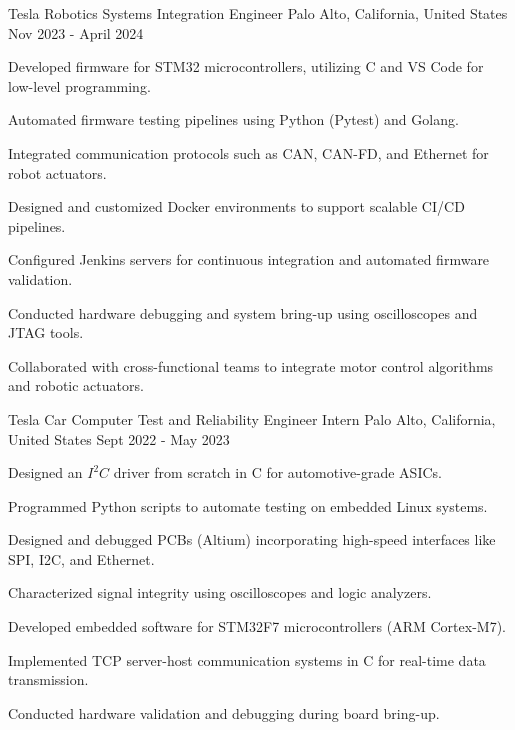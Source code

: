 \begin{cventries}
\cventry
    {Tesla} 
    { Robotics Systems Integration Engineer} 
    {Palo Alto, California, United States} %
    {Nov 2023 - April 2024 } %
    {
      \begin{cvitems} %
        \item Developed firmware for STM32 microcontrollers, utilizing C and VS Code for low-level programming.
        \item Automated firmware testing pipelines using Python (Pytest) and Golang.
        \item Integrated communication protocols such as CAN, CAN-FD, and Ethernet for robot actuators.
        \item Designed and customized Docker environments to support scalable CI/CD pipelines.
        \item Configured Jenkins servers for continuous integration and automated firmware validation.
        \item Conducted hardware debugging and system bring-up using oscilloscopes and JTAG tools.
        \item Collaborated with cross-functional teams to integrate motor control algorithms and robotic actuators.
      \end{cvitems}
    }

\cventry
    {Tesla} 
    {Car Computer Test and Reliability Engineer Intern} 
    {Palo Alto, California, United States} %
    {Sept 2022 - May 2023} %
    {
      \begin{cvitems} %
        \item Designed an $I^2C$ driver from scratch in C for automotive-grade ASICs.
        \item Programmed Python scripts to automate testing on embedded Linux systems.
        \item Designed and debugged PCBs (Altium) incorporating high-speed interfaces like SPI, I2C, and Ethernet.
        \item Characterized signal integrity using oscilloscopes and logic analyzers.
        \item Developed embedded software for STM32F7 microcontrollers (ARM Cortex-M7).
        \item Implemented TCP server-host communication systems in C for real-time data transmission.
        \item Conducted hardware validation and debugging during board bring-up.
      \end{cvitems}
    }


\end{cventries}
